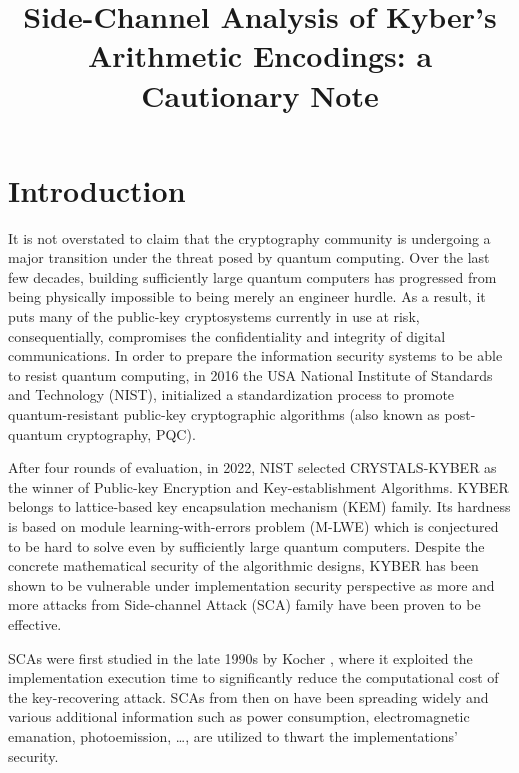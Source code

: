\documentclass{llncs}
\begin{document}
 

\title{Side-Channel Analysis of Kyber's	Arithmetic Encodings: a Cautionary Note}
\maketitle

\begin{abstract}

\end{abstract}


\section{Introduction}

It is not overstated to claim that the cryptography community is undergoing a major transition under the threat posed by quantum computing. Over the last few decades, building sufficiently large quantum computers has progressed from being physically impossible to being merely an engineer hurdle. As a result, it puts many of the public-key cryptosystems currently in use at risk, consequentially, compromises the confidentiality and integrity of digital communications. In order to prepare the information security systems to be able to resist quantum computing, in 2016 the USA National Institute of Standards and Technology (NIST), initialized a standardization process to promote quantum-resistant public-key cryptographic algorithms (also known as post-quantum cryptography, PQC). 

After four rounds of evaluation, in 2022, NIST selected CRYSTALS-KYBER \cite{kyber} as the winner of Public-key Encryption and Key-establishment Algorithms. KYBER belongs to lattice-based key encapsulation mechanism (KEM) family. Its hardness is based on module learning-with-errors problem (M-LWE) which is conjectured to be hard to solve even by sufficiently large quantum computers. Despite the concrete mathematical security of the algorithmic designs, KYBER has been shown to be vulnerable under implementation security perspective as more and more attacks from Side-channel Attack (SCA) family have been proven to be effective. 

SCAs were first studied in the late 1990s by Kocher \cite{kocher}, where it exploited the implementation execution time to significantly reduce the computational cost of the key-recovering attack. SCAs from then on have been spreading widely and various  additional information such as power consumption, electromagnetic emanation, photoemission, \dots, are utilized to thwart the implementations' security.
\end{document}
